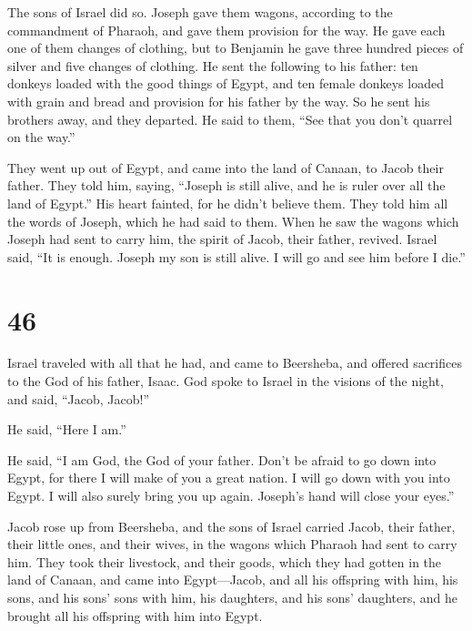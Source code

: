  The sons of Israel did so. Joseph gave them wagons,
according to the commandment of Pharaoh, and gave them provision for the
way.  He gave each one of them changes of clothing, but to
Benjamin he gave three hundred pieces of silver and five changes of
clothing.  He sent the following to his father: ten donkeys
loaded with the good things of Egypt, and ten female donkeys loaded with
grain and bread and provision for his father by the way. 
So he sent his brothers away, and they departed. He said to them, ``See
that you don't quarrel on the way.''

 They went up out of Egypt, and came into the land of
Canaan, to Jacob their father.  They told him, saying,
``Joseph is still alive, and he is ruler over all the land of Egypt.''
His heart fainted, for he didn't believe them.  They told
him all the words of Joseph, which he had said to them. When he saw the
wagons which Joseph had sent to carry him, the spirit of Jacob, their
father, revived.  Israel said, ``It is enough. Joseph my
son is still alive. I will go and see him before I die.''

\hypertarget{section-45}{%
\section{46}\label{section-45}}

 Israel traveled with all that he had, and came to
Beersheba, and offered sacrifices to the God of his father, Isaac.
 God spoke to Israel in the visions of the night, and said,
``Jacob, Jacob!''

He said, ``Here I am.''

 He said, ``I am God, the God of your father. Don't be
afraid to go down into Egypt, for there I will make of you a great
nation.  I will go down with you into Egypt. I will also
surely bring you up again. Joseph's hand will close your eyes.''

 Jacob rose up from Beersheba, and the sons of Israel
carried Jacob, their father, their little ones, and their wives, in the
wagons which Pharaoh had sent to carry him.  They took their
livestock, and their goods, which they had gotten in the land of Canaan,
and came into Egypt---Jacob, and all his offspring with him,
 his sons, and his sons' sons with him, his daughters, and
his sons' daughters, and he brought all his offspring with him into
Egypt.

